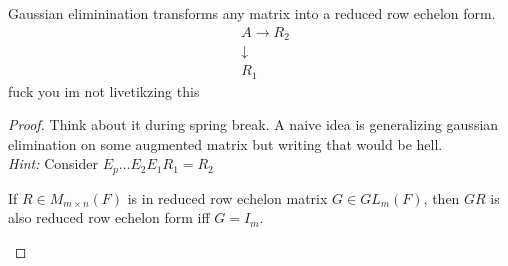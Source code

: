 \documentclass[12pt, letterpaper]{article}
\begin{document}
  \begin{theorem}[Insel 3.14]
    Gaussian eliminination transforms any matrix into a reduced row echelon form.
    \begin{align*}
      &A \rightarrow R_2 \\
      &\downarrow \\
      &R_1
    \end{align*}
    fuck you im not livetikzing this
    \begin{proof}
      Think about it during spring break.
      A naive idea is generalizing gaussian elimination on some augmented matrix but writing that would be hell.
      \\
      \textit{Hint:} Consider $E_p \ldots E_2E_1 R_1 = R_2$
      \begin{exercise}
        If $R \in M_{m\times n}(F)$ is in reduced row echelon matrix $G \in GL_m(F)$, then $GR$ is also reduced row echelon form iff $G = I_m$.
      \end{exercise}
    \end{proof}
  \end{theorem}
\end{document}
